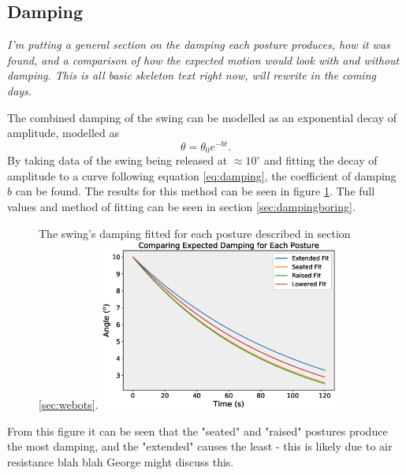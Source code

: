 \documentclass[11pt]{article}
\newcommand*\ruleline[1]{\par\noindent\raisebox{.8ex}{\makebox[\linewidth]{\hrulefill\hspace{1ex}\raisebox{-.8ex}{#1}\hspace{1ex}\hrulefill}}}
\begin{document}
\subsection{Damping}
\ruleline{James Doering}
\textit{I'm putting a general section on the damping each posture produces, how it was found, and a comparison of how the expected motion would look with and without damping. This is all basic skeleton text right now, will rewrite in the coming days.}

The combined damping of the swing can be modelled as an exponential decay of amplitude, modelled as 
\begin{equation} \label{eq:damping}
    \theta = \theta_0 e^{-bt}.
\end{equation}
By taking data of the swing being released at $\approx 10^\circ$ and fitting the decay of amplitude to a curve following equation \ref{eq:damping}, the coefficient of damping $b$ can be found. The results for this method can be seen in figure \ref{fig:dampingpositions}. The full values and method of fitting can be seen in section \ref{sec:dampingboring}.

    \begin{figure}[]
        \centering
        \captionbox
             {The swing's damping fitted for each posture described in section \ref{sec:webots}.\label{fig:dampingpositions}}
             {\includegraphics[width=0.7\textwidth]{DampingComparison.eps}}
    \end{figure}
 
From this figure it can be seen that the "seated" and "raised" postures produce the most damping, and the "extended" causes the least - this is likely due to air resistance blah blah George might discuss this.\\
\end{document}
